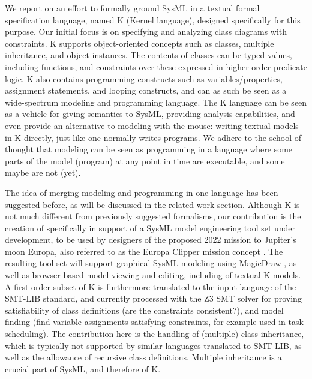 We report on an effort to formally ground SysML in a textual formal
specification language, named K (Kernel language), designed
specifically for this purpose.  Our initial focus is on specifying and
analyzing class diagrams with constraints. K supports object-oriented
concepts such as classes, multiple inheritance, and object
instances. The contents of classes can be typed values, including
functions, and constraints over these expressed in higher-order
predicate logic.  K also contains programming constructs such as
variables/properties, assignment statements, and looping constructs,
and can as such be seen as a wide-spectrum modeling and programming
language.  The K language can be seen as a vehicle for giving
semantics to SysML, providing analysis capabilities, and even provide
an alternative to modeling with the mouse: writing textual models in K
directly, just like one normally writes programs.  We adhere to the
school of thought that modeling can be seen as programming in a
language where some parts of the model (program) at any point in time
are executable, and some maybe are not (yet).

The idea of merging modeling and programming in one language has been
suggested before, as will be discussed in the related work section.
Although K is not much different from previously suggested formalisms,  
our contribution is the creation of \Klang{} specifically in support of a
SysML model engineering tool set under development, to be used by
designers of the proposed 2022 mission to Jupiter's moon Europa, also
referred to as the Europa Clipper mission concept
\cite{europa-clipper}.  The resulting tool set will support graphical
SysML modeling using MagicDraw \cite{magicdraw}, as well as
browser-based model viewing and editing, including of textual K
models. A first-order subset of K is furthermore translated to the input language of the
SMT-LIB standard, and currently processed with the Z3 SMT solver for
proving satisfiability of class definitions (are the constraints
consistent?), and model finding (find variable assignments satisfying
constraints, for example used in task scheduling).  The contribution here is
the handling of (multiple) class inheritance, which is typically not supported
by similar languages translated to SMT-LIB, as well as the allowance
of recursive class definitions. Multiple inheritance is a crucial part
of SysML, and therefore of K.


